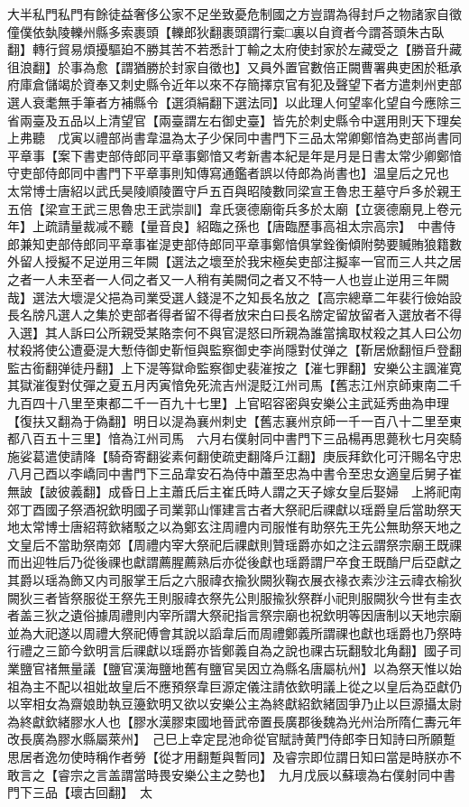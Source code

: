 大半私門私門有餘徒益奢侈公家不足坐致憂危制國之方豈謂為得封戶之物諸家自徵僮僕依埶陵轢州縣多索裹頭【轢郎狄翻裹頭謂行槖□裏以自資者今謂荅頭朱古臥翻】轉行貿易煩擾驅廹不勝其苦不若悉計丁輸之太府使封家於左藏受之【勝音升藏徂浪翻】於事為愈【謂猶勝於封家自徵也】又員外置官數倍正闕曹署典吏困於秪承府庫倉儲竭於資奉又刺史縣令近年以來不存簡擇京官有犯及聲望下者方遣刺州吏部選人衰耄無手筆者方補縣令【選須絹翻下選法同】以此理人何望率化望自今應除三省兩臺及五品以上清望官【兩臺謂左右御史臺】皆先於刺史縣令中選用則天下理矣上弗聽　戊寅以禮部尚書韋温為太子少保同中書門下三品太常卿鄭愔為吏部尚書同平章事【案下書吏部侍郎同平章事鄭愔又考新書本紀是年是月是日書太常少卿鄭愔守吏部侍郎同中書門下平章事則知傳寫通鑑者誤以侍郎為尚書也】温皇后之兄也　太常博士唐紹以武氏昊陵順陵置守戶五百與昭陵數同梁宣王魯忠王墓守戶多於親王五倍【梁宣王武三思魯忠王武崇訓】韋氏褒德廟衛兵多於太廟【立褒德廟見上卷元年】上疏請量裁减不聽【量音良】紹臨之孫也【唐臨歷事高祖太宗高宗】　中書侍郎兼知吏部侍郎同平章事崔湜吏部侍郎同平章事鄭愔俱掌銓衡傾附勢要贓賄狼籍數外留人授擬不足逆用三年闕【選法之壞至於我宋極矣吏部注擬率一官而三人共之居之者一人未至者一人伺之者又一人稍有美闕伺之者又不特一人也豈止逆用三年闕哉】選法大壞湜父挹為司業受選人錢湜不之知長名放之【高宗總章二年裴行儉始設長名牓凡選人之集於吏部者得者留不得者放宋白曰長名牓定留放留者入選放者不得入選】其人訴曰公所親受某賂柰何不與官湜怒曰所親為誰當擒取杖殺之其人曰公勿杖殺將使公遭憂湜大慙侍御史靳恒與監察御史李尚隱對仗弹之【靳居焮翻恒戶登翻監古銜翻弹徒丹翻】上下湜等獄命監察御史裴漼按之【漼七罪翻】安樂公主諷漼寛其獄漼復對仗彈之夏五月丙寅愔免死流吉州湜貶江州司馬【舊志江州京師東南二千九百四十八里至東都二千一百九十七里】上官昭容密與安樂公主武延秀曲為申理【復扶又翻為于偽翻】明日以湜為襄州刺史【舊志襄州京師一千一百八十二里至東都八百五十三里】愔為江州司馬　六月右僕射同中書門下三品楊再思薨秋七月突騎施娑葛遣使請降【騎奇寄翻娑素何翻使疏吏翻降戶江翻】庚辰拜欽化可汗賜名守忠　八月己酉以李嶠同中書門下三品韋安石為侍中蕭至忠為中書令至忠女適皇后舅子崔無詖【詖彼義翻】成昏日上主蕭氏后主崔氏時人謂之天子嫁女皇后娶婦　上將祀南郊丁酉國子祭酒祝欽明國子司業郭山惲建言古者大祭祀后祼獻以瑶爵皇后當助祭天地太常博士唐紹蒋欽緒駁之以為鄭玄注周禮内司服惟有助祭先王先公無助祭天地之文皇后不當助祭南郊【周禮内宰大祭祀后祼獻則贊瑶爵亦如之注云謂祭宗廟王既祼而出迎牲后乃從後祼也獻謂薦腥薦熟后亦從後獻也瑶爵謂尸卒食王既酳尸后亞獻之其爵以瑶為飾又内司服掌王后之六服禕衣揄狄闕狄鞠衣展衣禒衣素沙注云禕衣榆狄闕狄三者皆祭服從王祭先王則服禕衣祭先公則服揄狄祭群小祀則服闕狄今世有圭衣者盖三狄之遺俗據周禮則内宰所謂大祭祀指言祭宗廟也祝欽明等因唐制以天地宗廟並為大祀遂以周禮大祭祀傅會其說以謟韋后而周禮鄭義所謂祼也獻也瑶爵也乃祭時行禮之三節今欽明言后祼獻以瑶爵亦皆鄭義自為之說也祼古玩翻駮北角翻】國子司業鹽官禇無量議【鹽官漢海鹽地舊有鹽官吴因立為縣名唐屬杭州】以為祭天惟以始祖為主不配以祖妣故皇后不應預祭韋巨源定儀注請依欽明議上從之以皇后為亞獻仍以宰相女為齋娘助執豆籩欽明又欲以安樂公主為終獻紹欽緒固爭乃止以巨源攝太尉為終獻欽緒膠水人也【膠水漢膠束國地晉武帝置長廣郡後魏為光州治所隋仁夀元年改長廣為膠水縣屬萊州】　己巳上幸定昆池命從官賦詩黄門侍郎李日知詩曰所願蹔思居者逸勿使時稱作者勞【從才用翻蹔與暫同】及睿宗即位謂日知曰當是時朕亦不敢言之【睿宗之言盖謂當時畏安樂公主之勢也】　九月戊辰以蘇瓌為右僕射同中書門下三品【瓌古回翻】　太